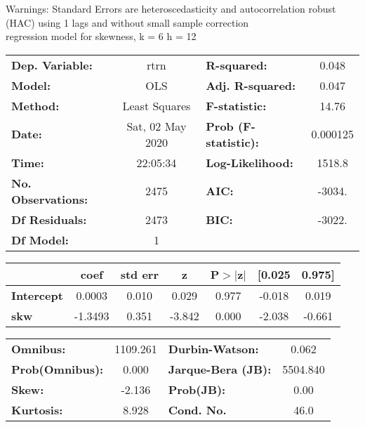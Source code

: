 Warnings: \newline
 [1] Standard Errors are heteroscedasticity and autocorrelation robust (HAC) using 1 lags and without small sample correction\\ 

regression model for skewness, k = 6 h = 12\begin{center}
\begin{tabular}{lclc}
\toprule
\textbf{Dep. Variable:}    &       rtrn       & \textbf{  R-squared:         } &     0.048   \\
\textbf{Model:}            &       OLS        & \textbf{  Adj. R-squared:    } &     0.047   \\
\textbf{Method:}           &  Least Squares   & \textbf{  F-statistic:       } &     14.76   \\
\textbf{Date:}             & Sat, 02 May 2020 & \textbf{  Prob (F-statistic):} &  0.000125   \\
\textbf{Time:}             &     22:05:34     & \textbf{  Log-Likelihood:    } &    1518.8   \\
\textbf{No. Observations:} &        2475      & \textbf{  AIC:               } &    -3034.   \\
\textbf{Df Residuals:}     &        2473      & \textbf{  BIC:               } &    -3022.   \\
\textbf{Df Model:}         &           1      & \textbf{                     } &             \\
\bottomrule
\end{tabular}
\begin{tabular}{lcccccc}
                   & \textbf{coef} & \textbf{std err} & \textbf{z} & \textbf{P$> |$z$|$} & \textbf{[0.025} & \textbf{0.975]}  \\
\midrule
\textbf{Intercept} &       0.0003  &        0.010     &     0.029  &         0.977        &       -0.018    &        0.019     \\
\textbf{skw}       &      -1.3493  &        0.351     &    -3.842  &         0.000        &       -2.038    &       -0.661     \\
\bottomrule
\end{tabular}
\begin{tabular}{lclc}
\textbf{Omnibus:}       & 1109.261 & \textbf{  Durbin-Watson:     } &    0.062  \\
\textbf{Prob(Omnibus):} &   0.000  & \textbf{  Jarque-Bera (JB):  } & 5504.840  \\
\textbf{Skew:}          &  -2.136  & \textbf{  Prob(JB):          } &     0.00  \\
\textbf{Kurtosis:}      &   8.928  & \textbf{  Cond. No.          } &     46.0  \\
\bottomrule
\end{tabular}
\end{center}

